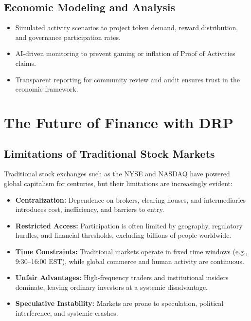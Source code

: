 \documentclass[11pt,a4paper]{article}
\begin{document}
\subsection{Economic Modeling and Analysis}
\begin{itemize}
    \item Simulated activity scenarios to project token demand, reward distribution, and governance participation rates.  
    \item AI-driven monitoring to prevent gaming or inflation of Proof of Activities claims.  
    \item Transparent reporting for community review and audit ensures trust in the economic framework.  
\end{itemize}

\section{The Future of Finance with DRP}

\subsection{Limitations of Traditional Stock Markets}
Traditional stock exchanges such as the NYSE and NASDAQ have powered global capitalism for centuries, but their limitations are increasingly evident:
\begin{itemize}
    \item \textbf{Centralization:} Dependence on brokers, clearing houses, and intermediaries introduces cost, inefficiency, and barriers to entry.
    \item \textbf{Restricted Access:} Participation is often limited by geography, regulatory hurdles, and financial thresholds, excluding billions of people worldwide.
    \item \textbf{Time Constraints:} Traditional markets operate in fixed time windows (e.g., 9:30--16:00 EST), while global commerce and human activity are continuous.
    \item \textbf{Unfair Advantages:} High-frequency traders and institutional insiders dominate, leaving ordinary investors at a systemic disadvantage.
    \item \textbf{Speculative Instability:} Markets are prone to speculation, political interference, and systemic crashes.
\end{itemize}
\end{document}
